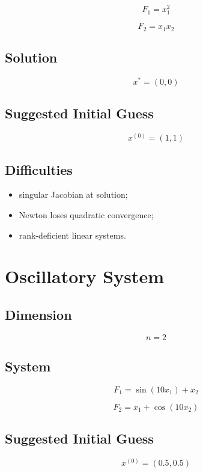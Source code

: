 \documentclass[11pt,a4paper]{article}
\begin{document}
\[
F_1=x_1^2
\]

\[
F_2=x_1x_2
\]

\subsection*{Solution}

\[
x^*=(0,0)
\]

\subsection*{Suggested Initial Guess}

\[
x^{(0)}=(1,1)
\]

\subsection*{Difficulties}

\begin{itemize}
  \item singular Jacobian at solution;
  \item Newton loses quadratic convergence;
  \item rank-deficient linear systems.
\end{itemize}

\section{Oscillatory System}

\subsection*{Dimension}

\[
n=2
\]

\subsection*{System}

\[
F_1=\sin(10x_1)+x_2
\]

\[
F_2=x_1+\cos(10x_2)
\]

\subsection*{Suggested Initial Guess}

\[
x^{(0)}=(0.5,0.5)
\]
\end{document}
